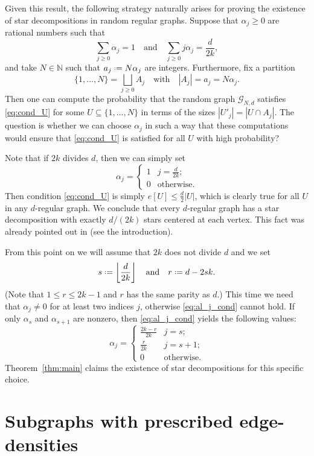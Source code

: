 \documentclass[12pt]{amsart}
\theoremstyle{definition}
\newcommand\Nb{\mathbb{N}}
\newcommand\Gc{\mathcal{G}}
\newcommand\al{\alpha}
\newcommand{\defeq}{\mathrel{\vcenter{\baselineskip0.5ex \lineskiplimit0pt
                     \hbox{\scriptsize.}\hbox{\scriptsize.}}}%
                     =}
\begin{document}
Given this result, the following strategy naturally arises for proving the existence of star decompositions in random regular graphs. Suppose that $\al_j \geq 0$ are rational numbers such that 
%
\begin{equation} \label{eq:al_j_cond}
\sum_{j\geq 0} \al_j = 1 
\quad \text{and} \quad 
\sum_{j\geq 0} j\al_j = \frac{d}{2k} ,
\end{equation}
%
and take $N \in \Nb$ such that $a_j \defeq N\al_j$ are integers. Furthermore, fix a partition 
%
\[ \{1,\ldots,N\} = \bigsqcup_{j \geq 0} A_j 
\quad \text{with} \quad 
|A_j|=a_j = N \al_j .\]
%
Then one can compute the probability that the random graph $\Gc_{N,d}$ satisfies \eqref{eq:cond_U} for some $U \subseteq \{1,\ldots,N\}$ in terms of the sizes $|U'_j|=|U \cap A_j|$. The question is whether we can choose $\al_j$ in such a way that these computations would ensure that \eqref{eq:cond_U} is satisfied for all $U$ with high probability?

Note that if $2k$ divides $d$, then we can simply set 
%
\[ \al_j = 
\begin{cases}
1 & j=\frac{d}{2k} ;\\
0 & \text{otherwise.}
\end{cases} \]
%
Then condition \eqref{eq:cond_U} is simply $e[U] \leq \frac{d}{2}|U|$, which is clearly true for all $U$ in any $d$-regular graph. We conclude that every $d$-regular graph has a star decomposition with exactly $d/(2k)$ stars centered at each vertex. This fact was already pointed out in \cite{delcourt2023decomposing} (see the introduction).

From this point on we will assume that $2k$ does not divide $d$ and we set 
%
\[ s \defeq \left\lfloor \frac{d}{2k} \right\rfloor 
\quad \text{and} \quad r \defeq d-2sk .\]
%
(Note that $1 \leq r \leq 2k-1$ and $r$ has the same parity as $d$.) This time we need that $\al_j\neq 0$ for at least two indices $j$, otherwise \eqref{eq:al_j_cond} cannot hold. If only $\al_s$ and $\al_{s+1}$ are nonzero, then \eqref{eq:al_j_cond} yields the following values:
%
\[ \al_j = 
\begin{cases}
\frac{2k-r}{2k} & j=s ;\\
\frac{r}{2k} & j =s+1 ;\\
0 & \text{otherwise.}
\end{cases} \]
%
Theorem~\ref{thm:main} claims the existence of star decompositions for this specific choice.


\section{Subgraphs with prescribed edge-densities} \label{sec:subgraphs}
\end{document}
